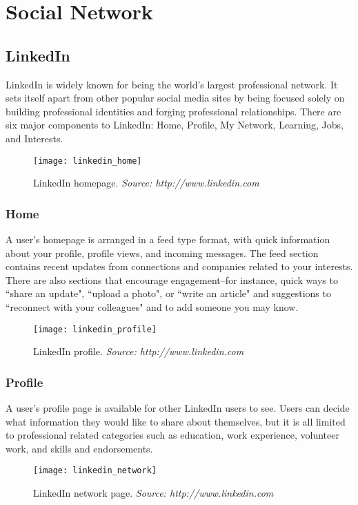 \section{Social Network}
\subsection{LinkedIn}
LinkedIn is widely known for being the world's largest professional network. It sets itself apart from other popular social media sites by being focused solely on building professional identities and forging professional relationships. There are six major components to LinkedIn: Home, Profile, My Network, Learning, Jobs, and Interests.

\begin{figure}[h]
\centering
\texttt{[image: linkedin\_home]}
\caption{LinkedIn homepage. \textit{Source: http://www.linkedin.com}}
\end{figure}

\subsubsection{Home}
A user's homepage is arranged in a feed type format, with quick information about your profile, profile views, and incoming messages. The feed section contains recent updates from connections and companies related to your interests. There are also sections that encourage engagement--for instance, quick ways to ``share an update", ``upload a photo", or ``write an article" and suggestions to ``reconnect with your colleagues" and to add someone you may know. 

\begin{figure}[h]
\centering
\texttt{[image: linkedin\_profile]}
\caption{LinkedIn profile. \textit{Source: http://www.linkedin.com}}
\end{figure}
\subsubsection{Profile}
A user's profile page is available for other LinkedIn users to see. Users can decide what information they would like to share about themselves, but it is all limited to professional related categories such as education, work experience, volunteer work, and skills and endorsements. 

\begin{figure}[h]
\centering
\texttt{[image: linkedin\_network]}
\caption{LinkedIn network page. \textit{Source: http://www.linkedin.com}}
\end{figure}
